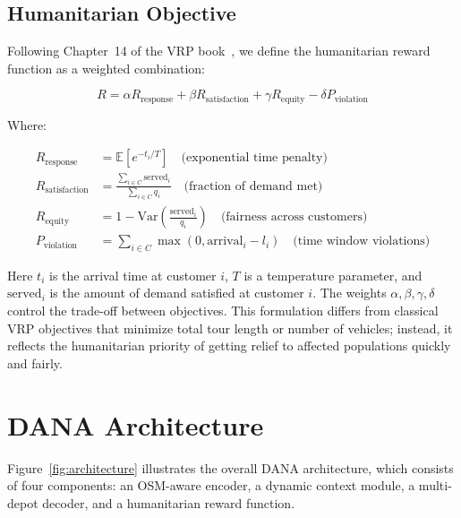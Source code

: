 \documentclass[12pt,a4paper]{article}
\begin{document}
\subsection{Humanitarian Objective}

Following Chapter~14 of the VRP book~\cite{vrpbook}, we define the
humanitarian reward function as a weighted combination:

\begin{equation}
	R = \alpha R_{\text{response}} + \beta R_{\text{satisfaction}} + \gamma R_{\text{equity}} - \delta P_{\text{violation}}
	\label{eq:reward}
\end{equation}

Where:

\begin{align}
	R_{\text{response}}     & = \mathbb{E}\left[e^{-t_i / T}\right] \quad \text{(exponential time penalty)}                     \\
	R_{\text{satisfaction}} & = \frac{\sum_{i \in C} \text{served}_i}{\sum_{i \in C} q_i} \quad \text{(fraction of demand met)} \\
	R_{\text{equity}}       & = 1 - \text{Var}\left(\frac{\text{served}_i}{q_i}\right) \quad \text{(fairness across customers)} \\
	P_{\text{violation}}    & = \sum_{i \in C} \max(0, \text{arrival}_i - l_i) \quad \text{(time window violations)}
\end{align}

Here $t_i$ is the arrival time at customer $i$, $T$ is a temperature
parameter, and $\text{served}_i$ is the amount of demand satisfied at customer
$i$. The weights $\alpha, \beta, \gamma, \delta$ control the trade-off between
objectives. This formulation differs from classical VRP objectives that
minimize total tour length or number of vehicles; instead, it reflects the
humanitarian priority of getting relief to affected populations quickly and
fairly.

\section{DANA Architecture}

Figure~\ref{fig:architecture} illustrates the overall DANA architecture, which
consists of four components: an OSM-aware encoder, a dynamic context module, a
multi-depot decoder, and a humanitarian reward function.
\end{document}
